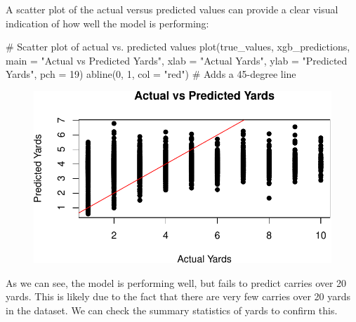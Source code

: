 \documentclass[
  super,
  preprint,
  3p]{elsarticle}
\newenvironment{Shaded}{\begin{snugshade}}{\end{snugshade}}
\newcommand{\AttributeTok}[1]{\textcolor[rgb]{0.40,0.45,0.13}{#1}}
\newcommand{\CommentTok}[1]{\textcolor[rgb]{0.37,0.37,0.37}{#1}}
\newcommand{\DecValTok}[1]{\textcolor[rgb]{0.68,0.00,0.00}{#1}}
\newcommand{\FunctionTok}[1]{\textcolor[rgb]{0.28,0.35,0.67}{#1}}
\newcommand{\NormalTok}[1]{\textcolor[rgb]{0.00,0.23,0.31}{#1}}
\newcommand{\SpecialCharTok}[1]{\textcolor[rgb]{0.37,0.37,0.37}{#1}}
\newcommand{\StringTok}[1]{\textcolor[rgb]{0.13,0.47,0.30}{#1}}
\begin{document}
A scatter plot of the actual versus predicted values can provide a clear
visual indication of how well the model is performing:

\begin{Shaded}
\begin{Highlighting}[]
\CommentTok{\# Scatter plot of actual vs. predicted values}
\FunctionTok{plot}\NormalTok{(true\_values, xgb\_predictions, }\AttributeTok{main =} \StringTok{"Actual vs Predicted Yards"}\NormalTok{, }\AttributeTok{xlab =} \StringTok{"Actual Yards"}\NormalTok{, }\AttributeTok{ylab =} \StringTok{"Predicted Yards"}\NormalTok{, }\AttributeTok{pch =} \DecValTok{19}\NormalTok{)}
\FunctionTok{abline}\NormalTok{(}\DecValTok{0}\NormalTok{, }\DecValTok{1}\NormalTok{, }\AttributeTok{col =} \StringTok{"red"}\NormalTok{)  }\CommentTok{\# Adds a 45{-}degree line}
\end{Highlighting}
\end{Shaded}

\begin{figure}[H]

{\centering \includegraphics{project_report_files/figure-pdf/unnamed-chunk-23-1.pdf}

}

\end{figure}

As we can see, the model is performing well, but fails to predict
carries over 20 yards. This is likely due to the fact that there are
very few carries over 20 yards in the dataset. We can check the summary
statistics of yards to confirm this.

\begin{Shaded}
\end{Shaded}
\end{document}

